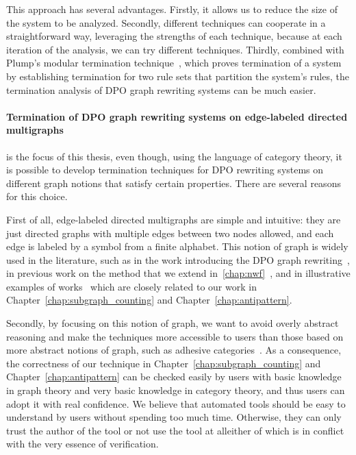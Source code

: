   This approach has several advantages.
  Firstly, it allows us to reduce the size of the system to be analyzed. Secondly, different techniques can cooperate in a straightforward way, leveraging the strengths of each technique, because at each iteration of the analysis, we can try different techniques.
   Thirdly, combined with Plump's modular termination technique~\cite{plump2018modular}, which proves termination of a system by establishing termination for two rule sets that partition the system's rules, the termination analysis of DPO graph rewriting systems can be much easier.

\paragraph{Termination of DPO graph rewriting systems on edge-labeled directed multigraphs} is the focus of this thesis, even though, using the language of category theory, it is possible to develop termination techniques for DPO rewriting systems on different graph notions that satisfy certain properties. There are several reasons for this choice.

First of all, edge-labeled directed multigraphs are simple and intuitive: they are just directed graphs with multiple edges between two nodes allowed, and each edge is labeled by a symbol from a finite alphabet. This notion of graph is widely used in the literature, such as in the work introducing the DPO graph rewriting~\cite{ehrig1973graph}, in previous work on the method that we extend in~\autoref{chap:nwf}~\cite{bruggink2014termination,bruggink2015proving,zantema2014termination}, and in illustrative examples of works~\cite{overbeek2024termination_lmcs,endrullis2024generalized_icgt} which are closely related to our work in Chapter~\autoref{chap:subgraph_counting} and Chapter~\autoref{chap:antipattern}.

 Secondly, by focusing on this notion of graph, we want to avoid overly abstract reasoning and make the techniques more accessible to users than those based on more abstract notions of graph, such as adhesive categories~\cite{lack2004adhesive}.
 As a consequence, the correctness of our technique in Chapter~\ref{chap:subgraph_counting} and Chapter~\ref{chap:antipattern} can be checked easily by users with basic knowledge in graph theory and very basic knowledge in category theory, and thus users can adopt it with real confidence.
 We believe that automated tools should be easy
to understand by users without
spending too much time. Otherwise, they can only trust the author of the tool
or not use the tool at all\textemdash either of which is in conflict with the very essence of verification.  


